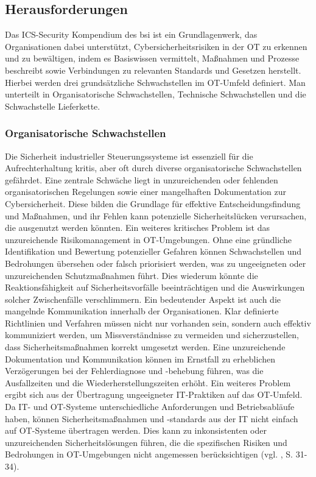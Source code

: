 \subsection{Herausforderungen}

Das ICS-Security Kompendium des \ac{bsi} ist ein Grundlagenwerk, das Organisationen dabei unterstützt, Cybersicherheitsrisiken in der OT zu erkennen und zu bewältigen, indem es Basiswissen vermittelt, Maßnahmen und Prozesse beschreibt sowie Verbindungen zu relevanten Standards und Gesetzen herstellt. Hierbei werden drei grundsätzliche Schwachstellen im OT-Umfeld definiert. Man unterteilt in Organisatorische Schwachstellen, Technische Schwachstellen und die Schwachstelle Lieferkette. 

\subsubsection{Organisatorische Schwachstellen}

Die Sicherheit industrieller Steuerungssysteme ist essenziell für die Aufrechterhaltung \ac{kritis}, aber oft durch diverse organisatorische Schwachstellen gefährdet. Eine zentrale Schwäche liegt in unzureichenden oder fehlenden organisatorischen Regelungen sowie einer mangelhaften Dokumentation zur Cybersicherheit. Diese bilden die Grundlage für effektive Entscheidungsfindung und Maßnahmen, und ihr Fehlen kann potenzielle Sicherheitslücken verursachen, die ausgenutzt werden könnten.
Ein weiteres kritisches Problem ist das unzureichende Risikomanagement in OT-Umgebungen. Ohne eine gründliche Identifikation und Bewertung potenzieller Gefahren können Schwachstellen und Bedrohungen übersehen oder falsch priorisiert werden, was zu ungeeigneten oder unzureichenden Schutzmaßnahmen führt. Dies wiederum könnte die Reaktionsfähigkeit auf Sicherheitsvorfälle beeinträchtigen und die Auswirkungen solcher Zwischenfälle verschlimmern. Ein bedeutender Aspekt ist auch die mangelnde Kommunikation innerhalb der Organisationen. Klar definierte Richtlinien und Verfahren müssen nicht nur vorhanden sein, sondern auch effektiv kommuniziert werden, um Missverständnisse zu vermeiden und sicherzustellen, dass Sicherheitsmaßnahmen korrekt umgesetzt werden. Eine unzureichende Dokumentation und Kommunikation können im Ernstfall zu erheblichen Verzögerungen bei der Fehlerdiagnose und -behebung führen, was die Ausfallzeiten und die Wiederherstellungszeiten erhöht. Ein weiteres Problem ergibt sich aus der Übertragung ungeeigneter IT-Praktiken auf das OT-Umfeld. Da IT- und OT-Systeme unterschiedliche Anforderungen und Betriebsabläufe haben, können Sicherheitsmaßnahmen und -standards aus der IT nicht einfach auf OT-Systeme übertragen werden. Dies kann zu inkonsistenten oder unzureichenden Sicherheitslösungen führen, die die spezifischen Risiken und Bedrohungen in OT-Umgebungen nicht angemessen berücksichtigen (vgl. \cite{ICS}, S. 31-34).

